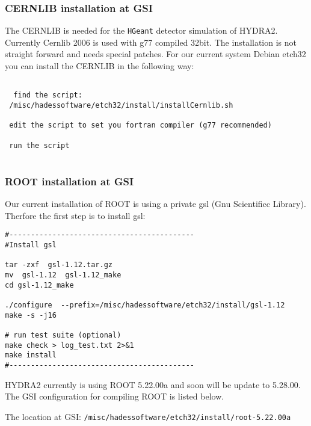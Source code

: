 \subsubsection{CERNLIB installation at GSI}\label{Chapter_CERNLIB_install}

The CERNLIB is needed for the \verb+HGeant+ detector simulation of HYDRA2.
Currently Cernlib 2006 is used with g77 compiled 32bit. The 
installation is not straight forward and needs special patches.
For our current system Debian etch32 you can install the CERNLIB
in the following way:

\begin{lstlisting}
 
  find the script:
 /misc/hadessoftware/etch32/install/installCernlib.sh
 
 edit the script to set you fortran compiler (g77 recommended)
 
 run the script
 
\end{lstlisting}

\subsubsection{ROOT installation at GSI}\label{Chapter_ROOT_install}

Our current installation of ROOT is using a private 
gsl (Gnu Scientificc Library). Therfore the first step is to install gsl:

\begin{lstlisting}
#-------------------------------------------
#Install gsl

tar -zxf  gsl-1.12.tar.gz
mv  gsl-1.12  gsl-1.12_make
cd gsl-1.12_make

./configure  --prefix=/misc/hadessoftware/etch32/install/gsl-1.12
make -s -j16

# run test suite (optional)
make check > log_test.txt 2>&1
make install
#-------------------------------------------
\end{lstlisting}



HYDRA2 currently is using ROOT 5.22.00a and soon will be update to 5.28.00.
The GSI configuration for compiling ROOT is listed below.

The location at GSI: \verb+/misc/hadessoftware/etch32/install/root-5.22.00a+

